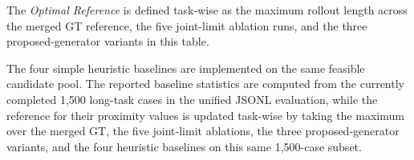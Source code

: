 \documentclass[journal, twoside]{IEEEtran}
\newcommand{\limebox}[1]{\setlength{\fboxsep}{0pt}{\colorbox{lime}{#1}}}
\newcommand{\pinkbox}[1]{\setlength{\fboxsep}{0pt}{\colorbox{yellow}{#1}}}
\newcommand{\xinyi}[1]{{\color{darkorange}\begin{CJK*}{UTF8}{gkai}#1\end{CJK*}}}
\begin{document}
\begin{table}[!htbp]
\begin{threeparttable}
{\begin{tabular}{llcccccccccc}
        \bottomrule
    \end{tabular}
\begin{tablenotes}
    \item[Note 1] The \emph{Optimal Reference} is defined task-wise as the maximum rollout length across the merged GT reference, the five joint-limit ablation runs, and the three proposed-generator variants in this table.
    \item[Note 2] The four simple heuristic baselines are implemented on the same feasible candidate pool. The reported baseline statistics are computed from the currently completed 1,500 long-task cases in the unified JSONL evaluation, while the reference for their proximity values is updated task-wise by taking the maximum over the merged GT, the five joint-limit ablations, the three proposed-generator variants, and the four heuristic baselines on this same 1,500-case subset.
\end{tablenotes}
}
\end{threeparttable}
\end{table}

\end{document}
